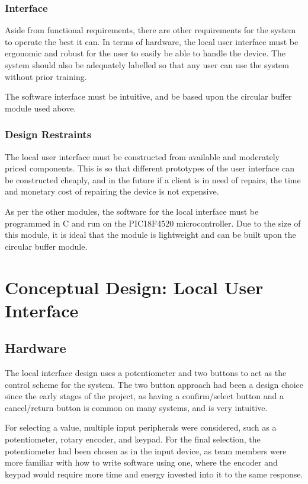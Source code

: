 \documentclass[]{report}
\begin{document}
\subsubsection{Interface}
Aside from functional requirements, there are other requirements for the system to operate the best it can. In terms of hardware, the local user interface must be ergonomic and robust for the user to easily be able to handle the device. The system should also be adequately labelled so that any user can use the system without prior training. 

The software interface must be intuitive, and be based upon the circular buffer module used above. 
\subsubsection{Design Restraints}
The local user interface must be constructed from available and moderately priced components. This is so that different prototypes of the user interface can be constructed cheaply, and in the future if a client is in need of repairs, the time and monetary cost of repairing the device is not expensive. 

As per the other modules, the software for the local interface must be programmed in C and run on the PIC18F4520 microcontroller. Due to the size of this module, it is ideal that the module is lightweight and can be built upon the circular buffer module.

\section{Conceptual Design: Local User Interface}
\subsection{Hardware}
The local interface design uses a potentiometer and two buttons to  act as the control scheme for the system. The two button approach had been a design choice since the early stages of the project, as having a confirm/select button and a cancel/return button is common on many systems, and is very intuitive. 

For selecting a value, multiple input peripherals were considered, such as a potentiometer, rotary encoder, and keypad. For the final selection, the potentiometer had been chosen as in the input device, as team members were more familiar with how to write software using one, where the encoder and keypad would require more time and energy invested into it to the same response. 
\end{document}
